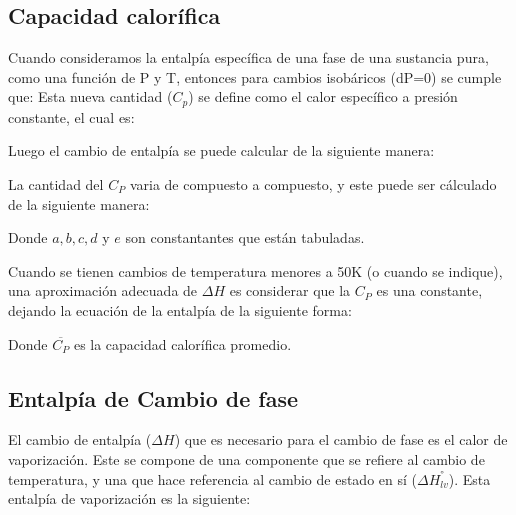 \subsection{Capacidad calorífica}

Cuando consideramos la entalpía específica de una fase de una sustancia pura, como una función de P y T, entonces para cambios isobáricos (dP=0) se cumple que:
Esta nueva cantidad ($C_p$) se define como el calor específico a presión constante, el cual es:


Luego el cambio de entalpía se puede calcular de la siguiente manera:

La cantidad del $C_P$ varia de compuesto a compuesto, y este puede ser cálculado de la siguiente manera:


Donde $a,b,c,d$ y $e$ son constantantes que están tabuladas.

Cuando se tienen cambios de temperatura menores a 50K (o cuando se indique), una aproximación adecuada de $\Delta H$ es considerar que la $C_P$ es una constante, dejando la ecuación de la entalpía de la siguiente forma:


Donde $\overline{C_P}$ es la capacidad calorífica promedio.

\subsection{Entalpía de Cambio de fase}

El cambio de entalpía ($\Delta H$) que es necesario para el cambio de fase es el calor de vaporización. Este se compone de una componente que se refiere al cambio de temperatura, y una que hace referencia al cambio de estado en sí ($\Delta H_{lv}^°$).
Esta entalpía de vaporización es la siguiente:


